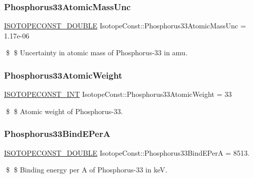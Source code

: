 \subsubsection{\texorpdfstring{Phosphorus33\+Atomic\+Mass\+Unc}{Phosphorus33AtomicMassUnc}}
{\footnotesize\ttfamily \mbox{\hyperlink{group___isotope_const-_macros_ga8f45a7272ce02c0b4c65c44636ed719a}{I\+S\+O\+T\+O\+P\+E\+C\+O\+N\+S\+T\+\_\+\+D\+O\+U\+B\+LE}} Isotope\+Const\+::\+Phosphorus33\+Atomic\+Mass\+Unc = 1.\+17e-\/06}

\$ \$ Uncertainty in atomic mass of Phosphorus-\/33 in amu. \mbox{\label{group___isotope_const-_phosphorus-_p33_ga30ad85fefe6c307b9abebcf625af6fab}} 
\subsubsection{\texorpdfstring{Phosphorus33\+Atomic\+Weight}{Phosphorus33AtomicWeight}}
{\footnotesize\ttfamily \mbox{\hyperlink{group___isotope_const-_macros_ga5f18360b3e99483a35c32d789e62621c}{I\+S\+O\+T\+O\+P\+E\+C\+O\+N\+S\+T\+\_\+\+I\+NT}} Isotope\+Const\+::\+Phosphorus33\+Atomic\+Weight = 33}

\$ \$ Atomic weight of Phosphorus-\/33. \mbox{\label{group___isotope_const-_phosphorus-_p33_ga7928bfb7d0a18dd85f076a1af05072e2}} 
\subsubsection{\texorpdfstring{Phosphorus33\+Bind\+E\+PerA}{Phosphorus33BindEPerA}}
{\footnotesize\ttfamily \mbox{\hyperlink{group___isotope_const-_macros_ga8f45a7272ce02c0b4c65c44636ed719a}{I\+S\+O\+T\+O\+P\+E\+C\+O\+N\+S\+T\+\_\+\+D\+O\+U\+B\+LE}} Isotope\+Const\+::\+Phosphorus33\+Bind\+E\+PerA = 8513.}

\$ \$ Binding energy per A of Phosphorus-\/33 in keV. \mbox{\label{group___isotope_const-_phosphorus-_p33_ga7f18d0933d3b333a6591c5cac58f7f4c}} 
